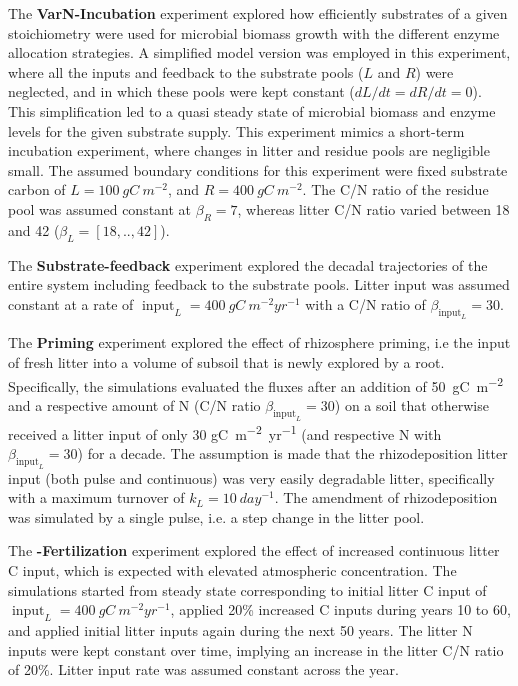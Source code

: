 The \textbf{VarN-Incubation} experiment explored how efficiently substrates
of a given stoichiometry were used for microbial biomass growth with the
different enzyme allocation strategies. A simplified model version was employed
in this experiment, where all the inputs and feedback to the substrate pools ($L$
and $R$) were neglected, and in which these pools were kept constant ($dL/dt =
dR/dt = 0$). This simplification led to a quasi steady state of microbial
biomass and enzyme levels for the given substrate supply. This experiment mimics
a short-term incubation experiment, where changes in litter and residue pools
are negligible small. The assumed boundary conditions for this experiment were
fixed substrate carbon of $L=100~\unit{gC~m^{-2}}$, and $R=400~
\unit{gC~m^{-2}}$. The C/N ratio of the residue pool was assumed constant at
$\beta_R=7$, whereas litter C/N ratio varied between 18 and 42 ($\beta_L =
[18,..,42]$).

The \textbf{Substrate-feedback} experiment explored the decadal trajectories of
the entire system including feedback to the substrate pools. Litter input was
assumed constant at a rate of $\operatorname{input}_L =
400~\unit{gC~m^{-2}yr^{-1}}$ with a C/N ratio of $\beta_{\operatorname{input}_L}
= 30$.

The \textbf{Priming} experiment explored the effect of rhizosphere priming, i.e
the input of fresh litter into a volume of subsoil that is newly explored by a
root. Specifically, the simulations evaluated the fluxes after an addition of
50~\unit{gC~m^{-2}} and a respective amount of N (C/N ratio
$\beta_{\operatorname{input}_L} = 30$) on a soil that otherwise received a
litter input of only 30 \unit{gC~m^{-2}yr^{-1}} (and respective N with
$\beta_{\operatorname{input}_L} = 30$) for a decade. The assumption is made that
the rhizodeposition litter input (both pulse and continuous) was very easily
degradable litter, specifically with a maximum turnover of $k_L =
10~\unit{day^{-1}}$. The amendment of rhizodeposition was simulated by a single
pulse, i.e. a step change in the litter pool.

The \textbf{-Fertilization} experiment explored the effect of
increased continuous litter C input, which is expected with elevated atmospheric
 concentration.
The simulations started from steady state corresponding to initial litter C
input of $\operatorname{input}_L = 400~\unit{gC~m^{-2}yr^{-1}}$, applied 20\%
increased C inputs during years 10 to 60, and applied initial litter inputs
again during the next 50 years. The litter N inputs were kept constant over
time, implying an increase in the litter C/N ratio of 20\%. Litter input rate
was assumed constant across the year.

